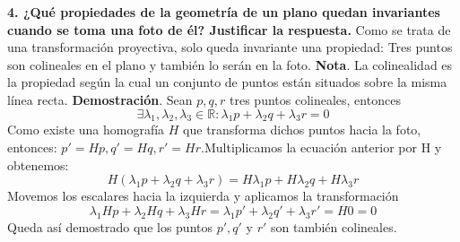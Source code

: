 \documentclass[12pt,a4paper]{article}
\begin{document}
	\newpage
	\textbf{4. ¿Qué propiedades de la geometría de un plano quedan invariantes cuando se toma una foto de él? Justificar la respuesta.}
	\newline\newline
	Como se trata de una transformación proyectiva, solo queda invariante una propiedad:\newline
	Tres puntos son colineales en el plano y también lo serán en la foto.\newline\newline
	\textbf{Nota}. La colinealidad es la propiedad según la cual un conjunto de puntos están situados sobre la misma línea recta.
	\newline
	\newline
	\textbf{Demostración}.\newline
	Sean $p, q, r$ tres puntos colineales, entonces  
	$$\exists \lambda_1, \lambda_2, \lambda_3\in \mathbb{R} : \lambda_1 p + \lambda_2 q + \lambda_3 r = 0$$
	Como existe una homografía $H$ que transforma dichos puntos hacia la foto, entonces: $p'=Hp, q'=Hq, r'=Hr$.\newline Multiplicamos la ecuación anterior por H y obtenemos:
	$$H(\lambda_1 p + \lambda_2 q + \lambda_3 r )= H \lambda_1 p + H \lambda_2 q + H \lambda_3 r$$
	Movemos los escalares hacia la izquierda y aplicamos la transformación
	$$\lambda_1 H p + \lambda_2 H q +  \lambda_3 H r = \lambda_1 p' + \lambda_2 q' +  \lambda_3 r'  = H 0 = 0$$
	Queda así demostrado que los puntos $p', q' $ y $r'$ son también colineales.
	
\end{document}
